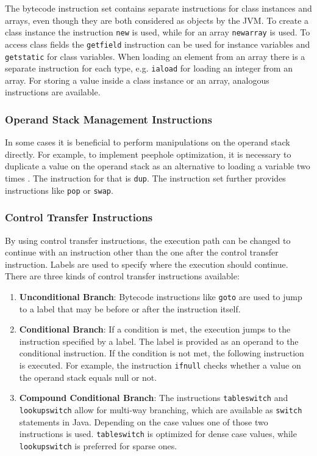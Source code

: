 The bytecode instruction set contains separate instructions for class instances and arrays, even though they are both considered as objects by the JVM. To create a class instance the instruction \texttt{new} is used, while for an array \texttt{newarray} is used. To access class fields the \texttt{getfield} instruction can be used for instance variables and \texttt{getstatic} for class variables. When loading an element from an array there is a separate instruction for each type, e.g. \texttt{iaload} for loading an integer from an array. For storing a value inside a class instance or an array, analogous instructions are available. 

\subsubsection{Operand Stack Management Instructions}

In some cases it is beneficial to perform manipulations on the operand stack directly. For example, to implement peephole optimization, it is necessary to duplicate a value on the operand stack as an alternative to loading a variable two times \parencite{mckeeman1965peephole}. The instruction for that is \texttt{dup}. The instruction set further provides instructions like \texttt{pop} or \texttt{swap}. 

\subsubsection{Control Transfer Instructions}

By using control transfer instructions, the execution path can be changed to continue with an instruction other than the one after the control transfer instruction. Labels are used to specify where the execution should continue. There are three kinds of control transfer instructions available:

\begin{enumerate}
    \item \textbf{Unconditional Branch}: Bytecode instructions like \texttt{goto} are used to jump to a label that may be before or after the instruction itself. 
    \item \textbf{Conditional Branch}: If a condition is met, the execution jumps to the instruction specified by a label. The label is provided as an operand to the conditional instruction. If the condition is not met, the following instruction is executed. For example, the instruction \texttt{ifnull} checks whether a value on the operand stack equals null or not.
    \item \textbf{Compound Conditional Branch}: The instructions \texttt{tableswitch} and \break \texttt{lookupswitch} allow for multi-way branching, which are available as \texttt{switch} statements in Java. Depending on the case values one of those two instructions is used. \texttt{tableswitch} is optimized for dense case values, while \texttt{lookupswitch} is preferred for sparse ones.
    
\end{enumerate}


